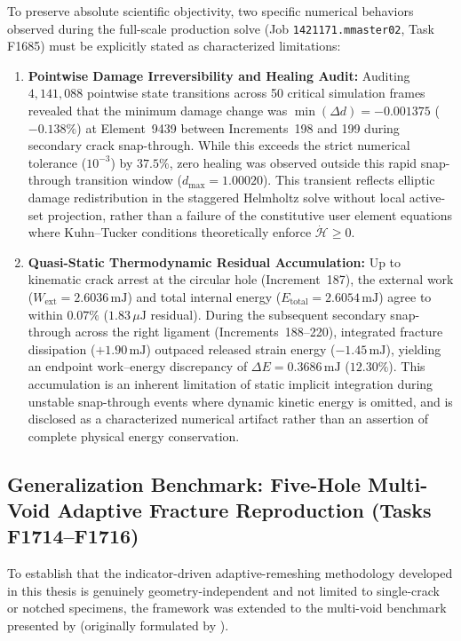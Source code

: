 To preserve absolute scientific objectivity, two specific numerical behaviors observed during the full-scale production solve (Job \texttt{1421171.mmaster02}, Task F1685) must be explicitly stated as characterized limitations:
\begin{enumerate}
  \item \textbf{Pointwise Damage Irreversibility and Healing Audit:} Auditing $4{,}141{,}088$ pointwise state transitions across 50 critical simulation frames revealed that the minimum damage change was $\min(\Delta d) = -0.001375$ ($-0.138\%$) at Element~9439 between Increments~198 and 199 during secondary crack snap-through. While this exceeds the strict numerical tolerance ($10^{-3}$) by $37.5\%$, zero healing was observed outside this rapid snap-through transition window ($d_{\max} = 1.00020$). This transient reflects elliptic damage redistribution in the staggered Helmholtz solve without local active-set projection, rather than a failure of the constitutive user element equations where Kuhn--Tucker conditions theoretically enforce $\dot{\mathcal{H}} \ge 0$.
  \item \textbf{Quasi-Static Thermodynamic Residual Accumulation:} Up to kinematic crack arrest at the circular hole (Increment~187), the external work ($W_{\mathrm{ext}} = 2.6036\,\mathrm{mJ}$) and total internal energy ($E_{\mathrm{total}} = 2.6054\,\mathrm{mJ}$) agree to within $0.07\%$ ($1.83\,\mu\mathrm{J}$ residual). During the subsequent secondary snap-through across the right ligament (Increments~188--220), integrated fracture dissipation ($+1.90\,\mathrm{mJ}$) outpaced released strain energy ($-1.45\,\mathrm{mJ}$), yielding an endpoint work--energy discrepancy of $\Delta E = 0.3686\,\mathrm{mJ}$ ($12.30\%$). This accumulation is an inherent limitation of static implicit integration during unstable snap-through events where dynamic kinetic energy is omitted, and is disclosed as a characterized numerical artifact rather than an assertion of complete physical energy conservation.
\end{enumerate}

\subsection{Generalization Benchmark: Five-Hole Multi-Void Adaptive Fracture Reproduction (Tasks F1714--F1716)}
\label{subsec:five_hole_generalization}

To establish that the indicator-driven adaptive-remeshing methodology developed in this thesis is genuinely geometry-independent and not limited to single-crack or notched specimens, the framework was extended to the multi-void benchmark presented by \citet[Section~4.5, Figures~22--25]{pandey2025} (originally formulated by \citet{han2023}).

